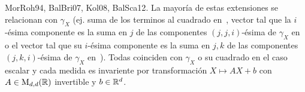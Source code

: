 \begin{itemize}
\begin{enumerate}
{{    MorRoh94, BalBri07, Kol08, BalSca12}.   La mayor\'ia de estas extensiones se
  relacionan   con  $\gamma_X$   (ej.   suma  de   los   terminos  al   cuadrado
  en~\cite{Mar70}, vector tal que la $i$-\'esima componente es la suma en $j$ de
  las componentes $(j,j,i)$-\'esima de $\gamma_X$ en~\cite{MorRoh94} o el vector
  tal  que su  $i$-\'esima componente  es la  suma en  $j,k$ de  las componentes
  $(j,k,i)$-\'esima  de   $\gamma_X$  en~\cite{Kol08}).   Todas   coinciden  con
  $\gamma_X$ o  su cuadrado en el caso  escalar y cada medida  es invariente por
  transformaci\'on $X \mapsto A X +  b$ con $A \in \mathrm{M}_{d,d}(\mathbb{R})$ invertible y
  $b \in \mathbb{R}^d$.}

\end{enumerate}
\end{itemize}
